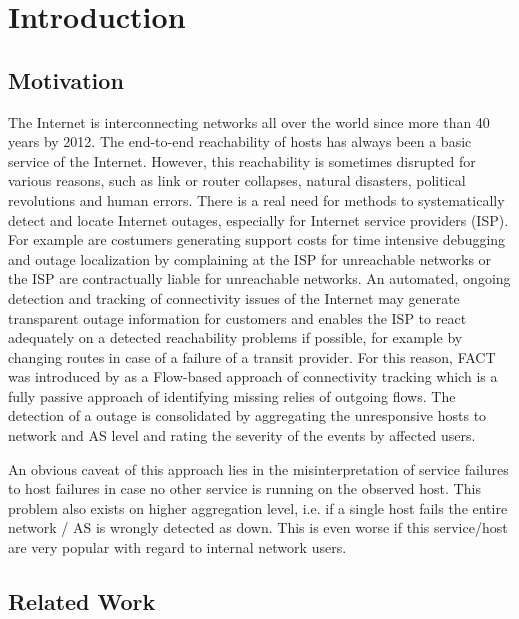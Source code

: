 
\chapter{Introduction}

\section{Motivation}

The Internet is interconnecting networks all over the world since more than 40 years by 2012. The end-to-end reachability of hosts has always been a basic service of the Internet. However, this reachability is sometimes disrupted for various reasons, such as link or router collapses\citep{}, natural disasters\citep{}, political revolutions\citep{} and human errors\citep{}. There is a real need for methods to systematically detect and locate Internet outages, especially for Internet service providers (ISP). For example are costumers generating support costs for time intensive debugging and outage localization by complaining at the ISP for unreachable networks or the ISP are contractually liable for unreachable networks. An automated, ongoing detection and tracking of connectivity issues of the Internet may generate transparent outage information for customers and enables the ISP to react adequately on a detected reachability problems if possible, for example by changing routes in case of a failure of a transit provider. For this reason, FACT was introduced by \citet{Schatzmann:PAM} as a Flow-based approach of connectivity tracking which is a fully passive approach of identifying missing relies of outgoing flows. The detection of a outage is consolidated by aggregating the unresponsive hosts to network and AS level and rating the severity of the events by affected users.

An obvious caveat of this approach lies in the misinterpretation of service failures to host failures in case no other service is running on the observed host. This problem also exists on higher aggregation level, i.e. if a single host fails the entire network / AS is wrongly detected as down. This is even worse if this service/host are very popular with regard to internal network users.



\section{Related Work}

